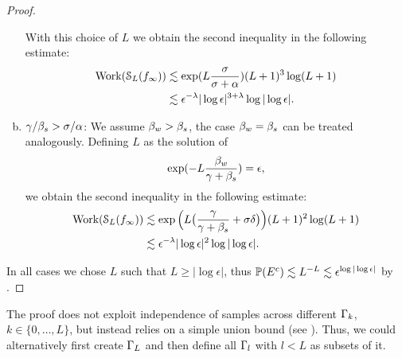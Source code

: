 \begin{proof}
\begin{enumerate}[(a)]
			With this choice of $L$ we obtain the second inequality in the following estimate:
			\begin{equation*}
			\begin{split}
			\text{Work}(\mathcal{S}_{L}(f_{\infty}))&\lesssim  \exp(L\frac{\sigma}{\sigma+\alpha})(L+1)^3\log(L+1)\\
			&\lesssim \epsilon^{-\lambda}|\log\epsilon|^{3+\lambda}\log|\log \epsilon|.
			\end{split}
			\end{equation*}
			
			\item $\gamma/\beta_{s}>\sigma/\alpha$: 
		We assume $\beta_{w}>\beta_{s}$, the case $\beta_{w}=\beta_{s}$ can be treated analogously. Defining $L$ as the solution of
			\begin{equation*}
			\exp(-L\frac{\beta_{w}}{\gamma+\beta_{s}})=\epsilon,
			\end{equation*}	
			we obtain the second inequality in the following estimate:
			\begin{equation*}
			\begin{split}
			\text{Work}(\mathcal{S}_{L}(f_{\infty}))&\lesssim \exp\Big(L\big(\frac{\gamma}{\gamma+\beta_{s}}+\sigma\delta\big)\Big)(L+1)^2\log(L+1)\\
			&\lesssim \epsilon^{-\lambda}|\log\epsilon|^2\log|\log\epsilon|.
			\end{split}
			\end{equation*}
		\end{enumerate}
		In all cases we chose $L$ such that $L\geq |\log\epsilon|$, thus $\mathbb{P}(E^c)\lesssim L^{-L}\lesssim \epsilon^{\log|\log\epsilon|}$ by .
\end{proof}
\begin{rem}
	The proof does not exploit independence of samples across different $\Gamma_k$, $k\in\{0,\dots,L\}$, but instead relies on a simple union bound (see ). Thus, we could alternatively first create $\Gamma_{L}$ and then define all $\Gamma_l$ with $l<L$ as subsets of it.
\end{rem}
